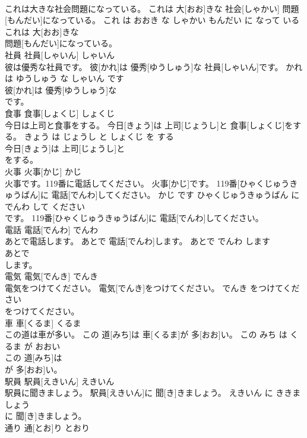 \documentclass[8pt]{extreport}
\begin{document}
\begin{CJK}{UTF8}{min}
\\	これは大きな社会問題になっている。	これは 大[おお]きな 社会[しゃかい] 問題[もんだい]になっている。	これ は おおき な しゃかい もんだい に なって いる	
\\	これは 大[おお]きな
\\	問題[もんだい]になっている。			
\\	社員	社員[しゃいん]	しゃいん	
\\	彼は優秀な社員です。	彼[かれ]は 優秀[ゆうしゅう]な 社員[しゃいん]です。	かれ は ゆうしゅう な しゃいん です	
\\	彼[かれ]は 優秀[ゆうしゅう]な
\\	です。			
\\	食事	食事[しょくじ]	しょくじ	
\\	今日は上司と食事をする。	今日[きょう]は 上司[じょうし]と 食事[しょくじ]をする。	きょう は じょうし と しょくじ を する	
\\	今日[きょう]は 上司[じょうし]と
\\	をする。			
\\	火事	火事[かじ]	かじ	
\\	火事です。119番に電話してください。	火事[かじ]です。 119番[ひゃくじゅうきゅうばん]に 電話[でんわ]してください。	かじ です ひゃくじゅうきゅうばん に でんわ して ください	
\\	です。 119番[ひゃくじゅうきゅうばん]に 電話[でんわ]してください。			
\\	電話	電話[でんわ]	でんわ	
\\	あとで電話します。	あとで 電話[でんわ]します。	あとで でんわ します	
\\	あとで
\\	します。			
\\	電気	電気[でんき]	でんき	
\\	電気をつけてください。	電気[でんき]をつけてください。	でんき をつけてください	
\\	をつけてください。			
\\	車	車[くるま]	くるま	
\\	この道は車が多い。	この 道[みち]は 車[くるま]が 多[おお]い。	この みち は くるま が おおい	
\\	この 道[みち]は
\\	が 多[おお]い。			
\\	駅員	駅員[えきいん]	えきいん	
\\	駅員に聞きましょう。	駅員[えきいん]に 聞[き]きましょう。	えきいん に ききましょう	
\\	に 聞[き]きましょう。			
\\	通り	通[とお]り	とおり	

\end{CJK}
\end{document}
